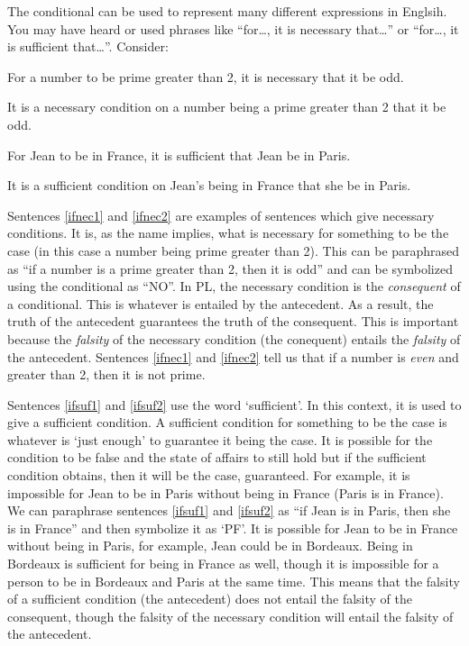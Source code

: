 The conditional can be used to represent many different expressions in Englsih. You may have heard or used phrases like ``for\ldots, it is necessary that\ldots'' or ``for\ldots, it is sufficient that\ldots''. Consider:
\begin{earg}
		\item[\ex{ifnec1}] For a number to be prime greater than 2, it is necessary that it be odd.
		\item[\ex{ifnec2}] It is a necessary condition on a number being a prime greater than 2 that it be odd.
		\item[\ex{ifsuf1}] For Jean to be in France, it is sufficient that Jean be in Paris.
		\item[\ex{ifsuf2}] It is a sufficient condition on Jean's being in France that she be in Paris.
	\end{earg}
Sentences \ref{ifnec1} and \ref{ifnec2} are examples of sentences which give \glspl{necessary condition}. It is, as the name implies, what is necessary for something to be the case (in this case a number being prime greater than 2). This can be paraphrased as ``if a number is a prime greater than 2, then it is odd'' and can be symbolized using the conditional as ``N\eif O''. In PL, the necessary condition is the \emph{consequent} of a conditional. This is whatever is entailed by the antecedent. As a result, the truth of the antecedent guarantees the truth of the consequent. This is important because the \emph{falsity} of the necessary condition (the conequent) entails the \emph{falsity} of the antecedent. Sentences \ref{ifnec1} and \ref{ifnec2} tell us that if a number is \emph{even} and greater than 2, then it is not prime. 

Sentences \ref{ifsuf1} and \ref{ifsuf2} use the word `sufficient'. In this context, it is used to give a \gls{sufficient condition}. A sufficient condition for something to be the case is whatever is `just enough' to guarantee it being the case. It is possible for the condition to be false and the state of affairs to still hold but if the sufficient condition obtains, then it will be the case, guaranteed. For example, it is impossible for Jean to be in Paris without being in France (Paris is in France). We can paraphrase sentences \ref{ifsuf1} and \ref{ifsuf2} as ``if Jean is in Paris, then she is in France'' and then symbolize it as `P\eif F'. It is possible for Jean to be in France without being in Paris, for example, Jean could be in Bordeaux. Being in Bordeaux is sufficient for being in France as well, though it is impossible for a person to be in Bordeaux and Paris at the same time. This means that the falsity of a sufficient condition (the antecedent) does not entail the falsity of the consequent, though the falsity of the necessary condition will entail the falsity of the antecedent. 

